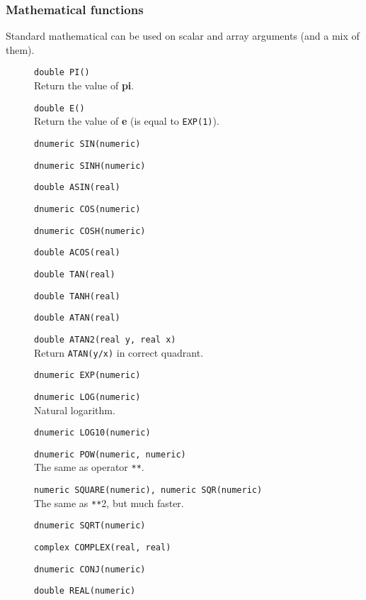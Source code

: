 \subsubsection{Mathematical functions}
Standard mathematical can be used on scalar and array arguments (and a mix of them).
\begin{description}
  \item[] \texttt{double PI()}\\
    Return the value of \textbf{pi}.
  \item[] \texttt{double E()}\\
    Return the value of \textbf{e} (is equal to \texttt{EXP(1)}).
  \item[] \texttt{dnumeric SIN(numeric)}
  \item[] \texttt{dnumeric SINH(numeric)}
  \item[] \texttt{double ASIN(real)}
  \item[] \texttt{dnumeric COS(numeric)}
  \item[] \texttt{dnumeric COSH(numeric)}
  \item[] \texttt{double ACOS(real)}
  \item[] \texttt{double TAN(real)}
  \item[] \texttt{double TANH(real)}
  \item[] \texttt{double ATAN(real)}
  \item[] \texttt{double ATAN2(real y, real x)}\\
    Return \texttt{ATAN(y/x)} in correct quadrant.
  \item[] \texttt{dnumeric EXP(numeric)}
  \item[] \texttt{dnumeric LOG(numeric)}\\
    Natural logarithm.
  \item[] \texttt{dnumeric LOG10(numeric)}
  \item[] \texttt{dnumeric POW(numeric, numeric)}\\
    The same as operator \verb+**+.
  \item[] \texttt{numeric SQUARE(numeric),  numeric SQR(numeric)}\\
    The same as \verb+**+2, but much faster.
  \item[] \texttt{dnumeric SQRT(numeric)}
  \item[] \texttt{complex COMPLEX(real, real)}
  \item[] \texttt{dnumeric CONJ(numeric)}
  \item[] \texttt{double REAL(numeric)}\\

\end{description}
